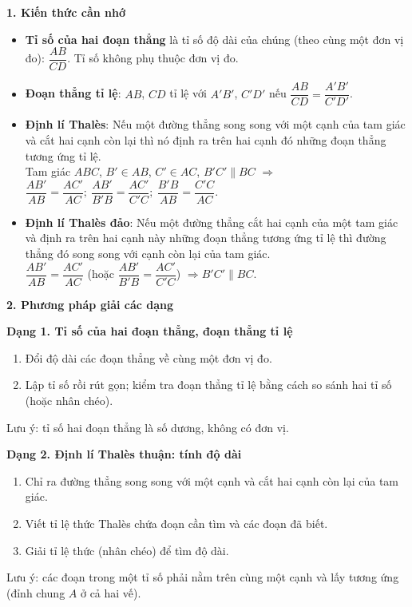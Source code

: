 \par{}\par\smallskip
\textbf{1. Kiến thức cần nhớ}
\begin{itemize}
\item \textbf{Tỉ số của hai đoạn thẳng} là tỉ số độ dài của chúng (theo cùng một đơn vị đo): $\dfrac{AB}{CD}$. Tỉ số không phụ thuộc đơn vị đo.
\item \textbf{Đoạn thẳng tỉ lệ}: $AB$, $CD$ tỉ lệ với $A'B'$, $C'D'$ nếu $\dfrac{AB}{CD}=\dfrac{A'B'}{C'D'}$.
\item \textbf{Định lí Thalès}: Nếu một đường thẳng song song với một cạnh của tam giác và cắt hai cạnh còn lại thì nó định ra trên hai cạnh đó những đoạn thẳng tương ứng tỉ lệ.\\
Tam giác $ABC$, $B'\in AB$, $C'\in AC$, $B'C'\parallel BC$ $\Rightarrow$ $\boxed{\dfrac{AB'}{AB}=\dfrac{AC'}{AC};\ \dfrac{AB'}{B'B}=\dfrac{AC'}{C'C};\ \dfrac{B'B}{AB}=\dfrac{C'C}{AC}}$.
\item \textbf{Định lí Thalès đảo}: Nếu một đường thẳng cắt hai cạnh của một tam giác và định ra trên hai cạnh này những đoạn thẳng tương ứng tỉ lệ thì đường thẳng đó song song với cạnh còn lại của tam giác.\\
$\dfrac{AB'}{AB}=\dfrac{AC'}{AC}$ (hoặc $\dfrac{AB'}{B'B}=\dfrac{AC'}{C'C}$) $\Rightarrow B'C'\parallel BC$.
\end{itemize}

\textbf{2. Phương pháp giải các dạng}

\textbf{Dạng 1. Tỉ số của hai đoạn thẳng, đoạn thẳng tỉ lệ}
\begin{enumerate}
\item Đổi độ dài các đoạn thẳng về cùng một đơn vị đo.
\item Lập tỉ số rồi rút gọn; kiểm tra đoạn thẳng tỉ lệ bằng cách so sánh hai tỉ số (hoặc nhân chéo).
\end{enumerate}
Lưu ý: tỉ số hai đoạn thẳng là số dương, không có đơn vị.

\textbf{Dạng 2. Định lí Thalès thuận: tính độ dài}
\begin{enumerate}
\item Chỉ ra đường thẳng song song với một cạnh và cắt hai cạnh còn lại của tam giác.
\item Viết tỉ lệ thức Thalès chứa đoạn cần tìm và các đoạn đã biết.
\item Giải tỉ lệ thức (nhân chéo) để tìm độ dài.
\end{enumerate}
Lưu ý: các đoạn trong một tỉ số phải nằm trên cùng một cạnh và lấy tương ứng (đỉnh chung $A$ ở cả hai vế).

